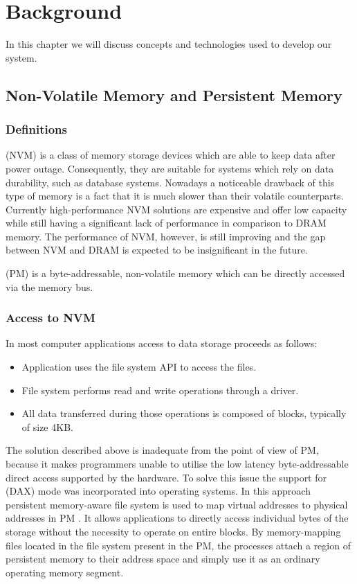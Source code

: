 \chapter{Background} \label{Background}

In this chapter we will discuss concepts and technologies used to develop our system.

\section{Non-Volatile Memory and Persistent Memory}
    

    \subsection{Definitions}
        \NVM (NVM) is a class of memory storage devices which are able to keep data after power outage. Consequently, they are suitable for systems which rely on data durability, such as database systems.
        Nowadays a noticeable drawback of this type of memory is a fact that it is much slower than their volatile counterparts.  
        Currently high-performance NVM solutions are expensive and offer low capacity while still having a significant lack of performance in comparison to DRAM memory. 
        The performance of NVM, however, is still improving and the gap between NVM and DRAM is expected to be insignificant in the future. 
        
        \PM (PM) is a byte-addressable, non-volatile memory which can be directly accessed via the memory bus.
        
    \subsection{Access to NVM}
    
        In most computer applications access to data storage proceeds as follows:
        \begin{itemize}
            \item Application uses the file system API to access the files.
            \item File system performs read and write operations through a driver.
            \item All data transferred during those operations is composed of blocks, typically of size 4KB.
        \end{itemize}
        The solution described above is inadequate from the point of view of PM, because it makes programmers unable to utilise the low latency byte-addressable direct access supported by the hardware.
        To solve this issue the support for \DAX (DAX) mode was incorporated into operating systems.
        In this approach persistent memory-aware file system is used to map virtual addresses to physical addresses in PM \cite{PmemAccess}. 
        It allows applications to directly access individual bytes of the storage without the necessity to operate on entire blocks. By memory-mapping files located in the file system present in the PM, the processes attach a region of persistent memory to their address space and simply use it as an ordinary operating memory  segment.
      
